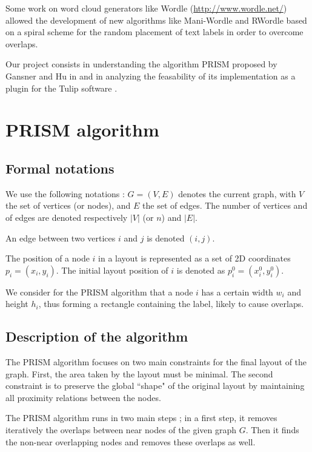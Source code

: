\documentclass[12pt]{report}
\begin{document}
Some work on word cloud generators like Wordle (\url{http://www.wordle.net/}) allowed the development of new algorithms like Mani-Wordle \cite{Koh10} and RWordle \cite{SSSK12} based on a spiral scheme for the random placement of text labels in order to overcome overlaps.


\bigskip
Our project consists in understanding the algorithm PRISM proposed by Gansner and Hu in \cite{Gansner08} and in analyzing the feasability of its implementation as a plugin for the Tulip software \cite{Auber12}.



\chapter{PRISM algorithm}

\section{Formal notations}

We use the following notations : $G = (V,E)$ denotes the current graph, with $V$ the set of vertices (or nodes), and $E$ the set of edges. The number of vertices and of edges are denoted respectively $|V|$ (or $n$) and $|E|$.

An edge between two vertices $i$ and $j$ is denoted $(i,j)$.

The position of a node $i$ in a layout is represented as a set of 2D coordinates $p_i = (x_i, y_i)$. The initial layout position of $i$ is denoted as $p_i^0 = (x_i^0, y_i^0)$.

We consider for the PRISM algorithm that a node $i$ has a certain width $w_i$ and height $h_i$, thus forming a rectangle containing the label, likely to cause overlaps.

\section{Description of the algorithm}

The PRISM algorithm focuses on two main constraints for the final layout of the graph. First, the area taken by the layout must be minimal. The second constraint is to preserve the global ``shape" of the original layout by maintaining all proximity relations between the nodes.

The PRISM algorithm runs in two main steps ; in a first step, it removes iteratively the overlaps between near nodes of the given graph $G$. Then it finds the non-near overlapping nodes and removes these overlaps as well.
\end{document}

